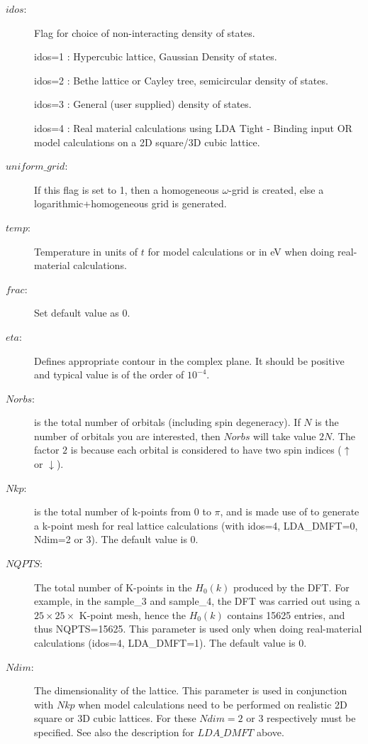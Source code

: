 \documentclass[a4paper]{article}
\begin{document}
\begin{description}
  \item [$idos$:] Flag for choice of non-interacting density of states.
  
                 idos=1 : Hypercubic lattice, Gaussian Density of states. 
                  
                  idos=2 : Bethe lattice or Cayley tree, semicircular density of states. 
                  
                  idos=3 : General (user supplied) density of states. 
                  
                  idos=4 : Real material calculations using LDA Tight - Binding input OR
                           model calculations on a 2D square/3D cubic lattice. 

\item [$uniform\_grid$:] If this flag is set to 1, then a homogeneous $\omega$-grid
is created, else a logarithmic+homogeneous grid is generated.

  \item [$temp$:] Temperature in units of $t$ for model calculations or in eV when doing
  real-material calculations. 
  \item [$frac$:] Set default value as 0.
  \item [$eta$:] Defines appropriate contour in the complex plane. It should be positive and typical value is of the order of $10^{-4}$.   
\item [$Norbs$:] is the total number of orbitals (including spin degeneracy). If $N$ is the
 number of orbitals you are interested, then $Norbs$ will take value $2N$. The factor $2$ is
  because each orbital is considered to have two spin indices ($\uparrow$ or $\downarrow$).
\item [$Nkp$:] is the total number of k-points from 0 to $\pi$, and is made use of to generate
a k-point mesh for real lattice calculations (with idos=4, LDA\_DMFT=0, Ndim=2 or 3). The default
value is 0.

\item [$NQPTS$:] The total number of K-points in the $H_0(k)$ produced by the DFT.  For example,
in the sample\_3 and sample\_4, the DFT was carried out using a $25\times25\times$ K-point mesh, hence
the $H_0(k)$ contains 15625 entries, and thus NQPTS=15625. This parameter is used only when
doing real-material calculations (idos=4, LDA\_DMFT=1). The default value is 0.

\item [$Ndim$:] The dimensionality of the lattice. This parameter is used in conjunction with
 $Nkp$ when model calculations need to be performed on realistic 2D square or 3D cubic lattices.
 For these $Ndim=2$ or $3$ respectively must be specified. See also the description for
 $LDA\_DMFT$ above.

 \end{description}
\end{document}
